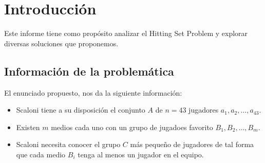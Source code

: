 \section{Introducción}

Este informe tiene como propósito analizar el Hitting Set Problem y explorar diversas soluciones que proponemos.


\subsection{Información de la problemática}

El enunciado propuesto, nos da la siguiente información:

\begin{itemize}

    \item Scaloni tiene a su disposición el conjunto $A$ de $n=43$ jugadores $a_1, a_2, \dots, a_{43}$.

    \item Existen $m$ medios cada uno con un grupo de jugadoes favorito $B_1, B_2, \dots, B_m$.

    \item Scaloni necesita conocer el grupo $C$ más pequeño de jugadores de tal forma que cada medio $B_i$ tenga al menos un jugador en el equipo.

\end{itemize}
